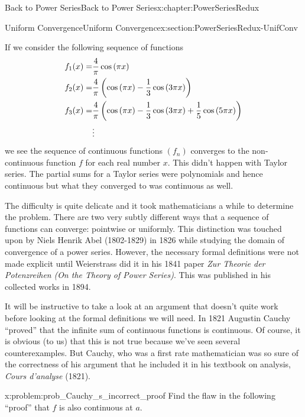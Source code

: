 \begin{chapterptx}{Back to Power Series}{}{Back to Power Series}{}{}{x:chapter:PowerSeriesRedux}
\begin{sectionptx}{Uniform Convergence}{}{Uniform Convergence}{}{}{x:section:PowerSeriesRedux-UnifConv}
\begin{image}{0.075}{0.85}{0.075}
		\end{image}%
		If we consider the following sequence of functions%
		\begin{align*}
			f_1(x)=& \frac{4}{\pi}\cos\left(\pi x\right)\\
			f_2(x)=& \frac{4}{\pi}\left(\cos \left(\pi x\right)-\frac{1}{3}\cos\left( 3\pi x\right)\right)\\
			f_3(x)=& \frac{4}{\pi}\left(\cos\left(\pi x\right)-\frac{1}{3}\cos\left(3\pi x\right)+\frac{1}{5}\cos\left(5\pi x\right)\right)\\
			& \vdots
		\end{align*}
		we see the sequence of continuous functions \(\left(f_n\right)\) converges to the non-continuous function \(f\) for each real number \(x\). This didn't happen with Taylor series. The partial sums for a Taylor series were polynomials and hence continuous but what they converged to was continuous as well.%
		\par
		The difficulty is quite delicate and it took mathematicians a while to determine the problem. There are two very subtly different ways that a sequence of functions can converge: pointwise or uniformly. This  distinction was touched upon by Niels Henrik Abel (1802-1829) in 1826 while studying the domain of convergence of a power series. However, the necessary formal definitions were not made explicit until Weierstrass  did it in his 1841 paper \textit{Zur Theorie der Potenzreihen} \emph{(On the Theory of Power Series)}. This was published in his collected works in 1894.%
		\par
		It will be instructive to take a look at an argument that doesn't quite work before looking at the formal definitions we will need. In 1821 Augustin Cauchy  ``proved'' that the infinite sum of continuous functions is continuous. Of course, it is obvious (to us) that this is not true because we've seen several counterexamples. But Cauchy, who was a first rate mathematician was so sure of the correctness of his argument that he included it in his textbook on analysis, \textit{Cours d'analyse} (1821).%
		\begin{problem}{}{x:problem:prob_Cauchy_s_incorrect_proof}%
			 Find the flaw in the following ``proof'' that \(f\) is also continuous at \(a\).%
			\par

\end{problem}
\end{sectionptx}
\end{chapterptx}
